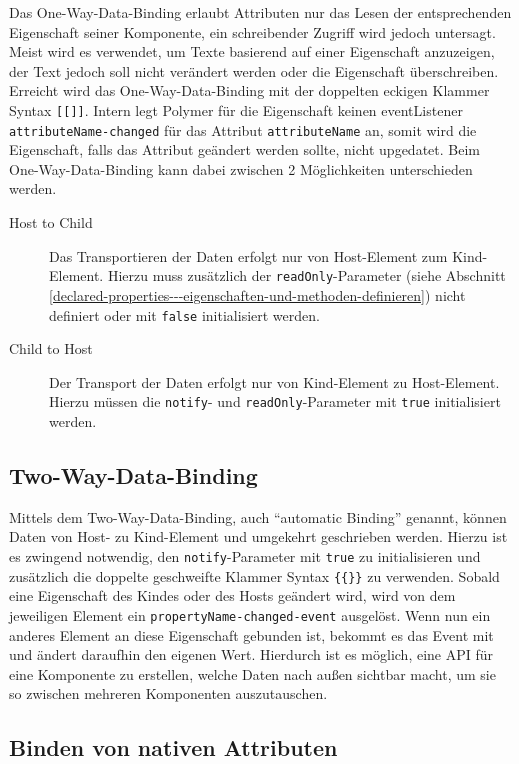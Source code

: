 Das One-Way-Data-Binding erlaubt Attributen nur das Lesen der entsprechenden Eigenschaft seiner Komponente, ein schreibender Zugriff wird jedoch untersagt. Meist wird es verwendet, um Texte basierend auf einer Eigenschaft anzuzeigen, der Text jedoch soll nicht verändert werden oder die Eigenschaft überschreiben. Erreicht wird das One-Way-Data-Binding mit der doppelten eckigen Klammer Syntax \texttt{{[}{[}{]}{]}}. Intern legt Polymer für die Eigenschaft keinen eventListener \texttt{attributeName-changed} für das Attribut \texttt{attributeName} an, somit wird die Eigenschaft, falls das Attribut geändert werden sollte, nicht upgedatet. Beim One-Way-Data-Binding kann dabei zwischen 2 Möglichkeiten unterschieden werden.

\begin{description}
  \item[Host to Child] Das Transportieren der Daten erfolgt nur von Host-Element zum Kind-Element. Hierzu muss zusätzlich der \texttt{readOnly}-Parameter (siehe Abschnitt \ref{declared-properties---eigenschaften-und-methoden-definieren}) nicht definiert oder mit \texttt{false} initialisiert werden.
  \item[Child to Host] Der Transport der Daten erfolgt nur von Kind-Element zu Host-Element. Hierzu müssen die \texttt{notify}- und \texttt{readOnly}-Parameter mit \texttt{true} initialisiert werden.
\end{description}


\subsection{Two-Way-Data-Binding}\label{two-way-data-binding}

Mittels dem Two-Way-Data-Binding, auch ``automatic Binding'' genannt, können Daten von Host- zu Kind-Element und umgekehrt geschrieben werden. Hierzu ist es zwingend notwendig, den \texttt{notify}-Parameter mit \texttt{true} zu initialisieren und zusätzlich die doppelte geschweifte Klammer Syntax \texttt{\{\{\}\}} zu verwenden. Sobald eine Eigenschaft des Kindes oder des Hosts geändert wird, wird von dem jeweiligen Element ein \texttt{propertyName-changed-event} ausgelöst. Wenn nun ein anderes Element an diese Eigenschaft gebunden ist, bekommt es das Event mit und ändert daraufhin den eigenen Wert. Hierdurch ist es möglich, eine \ac{API} für eine Komponente zu erstellen, welche Daten nach außen sichtbar macht, um sie so zwischen mehreren Komponenten auszutauschen.


\subsection{Binden von nativen Attributen}\label{binden-von-nativen-attributen}

